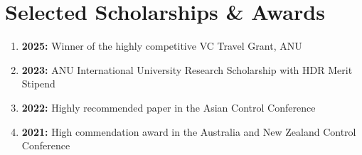 \section{Selected Scholarships \& Awards}
\begin{enumerate}\itemsep0em
    \item \textbf{2025:} Winner of the highly competitive VC Travel Grant, ANU
    \item \textbf{2023:} ANU International University Research Scholarship with HDR Merit Stipend
    \item \textbf{2022:} Highly recommended paper in the Asian Control Conference
    \item \textbf{2021:} High commendation award in the Australia and New Zealand Control Conference
\end{enumerate}
